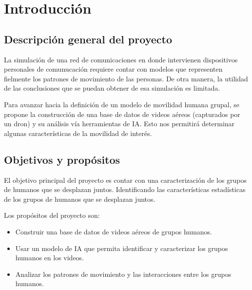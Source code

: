 	\section{Introducci\'on}
	\subsection{Descripci\'on general del proyecto}
	\noindent La simulaci\'on de una red de comunicaciones en donde intervienen dispositivos personales de comunucaci\'on requiere contar con modelos que representen fielmente los patrones de movimiento de las personas. De otra manera, la utilidad de las conclusiones que se puedan obtener de esa simulaci\'on es limitada. 

	\noindent Para avanzar hacia la definici\'on de un modelo de movilidad humana grupal, se propone la construcci\'on de una base de datos de videos a\'ereos (capturados por un dron) y su an\'alisis v\'ia herramientas de IA. Esto nos permitir\'a determinar algunas caracter\'isticas de la movilidad de inter\'es. 
	
	\subsection{Objetivos y prop\'ositos}
	\noindent El objetivo principal del proyecto es contar con una caracterizaci\'on de los grupos de humanos que se desplazan juntos. Identificando las caracter\'isticas estad\'isticas de los grupos de humanos que se desplazan juntos.

	\noindent Los prop\'ositos del proyecto son:
	\begin{itemize}
		\item Construir una base de datos de videos a\'ereos de grupos humanos.
		\item Usar un modelo de IA que permita identificar y caracterizar los grupos humanos en los videos.
		\item Analizar los patrones de movimiento y las interacciones entre los grupos humanos.
	\end{itemize}

